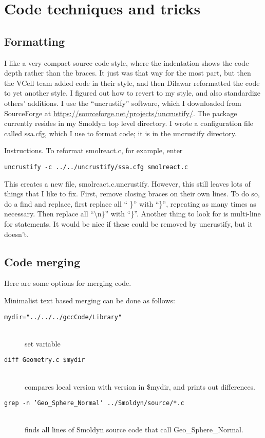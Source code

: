 \documentclass {book}
\begin{document}
\section{Code techniques and tricks}

\subsection{Formatting}

I like a very compact source code style, where the indentation shows the code depth rather than the braces. It just was that way for the most part, but then the VCell team added code in their style, and then Dilawar reformatted the code to yet another style. I figured out how to revert to my style, and also standardize others' additions. I use the ``uncrustify'' software, which I downloaded from SourceForge at \url{https://sourceforge.net/projects/uncrustify/}. The package currently resides in my Smoldyn top level directory. I wrote a configuration file called ssa.cfg, which I use to format code; it is in the uncrustify directory.

Instructions. To reformat smolreact.c, for example, enter

\texttt{uncrustify -c ../../uncrustify/ssa.cfg smolreact.c}

This creates a new file, smolreact.c.uncrustify. However, this still leaves lots of things that I like to fix. First, remove closing braces on their own lines. To do so, do a find and replace, first replace all `` \}'' with ``\}'', repeating as many times as necessary. Then replace all ``\textbackslash n\}'' with ``\}''. Another thing to look for is multi-line for statements. It would be nice if these could be removed by uncrustify, but it doesn't.

\subsection{Code merging}

Here are some options for merging code.

Minimalist text based merging can be done as follows:

\begin{description}
\item[\texttt{mydir="../../../gccCode/Library"}]
\hfill \\
set variable
\item[\texttt{diff Geometry.c \$mydir}]
\hfill \\
compares local version with version in \$mydir, and prints out differences.
\item[\texttt{grep -n 'Geo\_Sphere\_Normal' ../Smoldyn/source/*.c}]
\hfill \\
finds all lines of Smoldyn source code that call Geo\_Sphere\_Normal.
\end{description}
\end{document}
